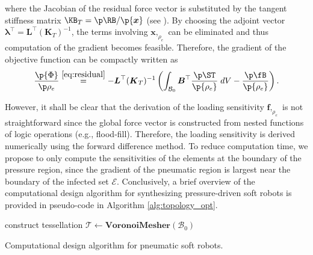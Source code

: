 \noindent where the Jacobian of the residual force vector is substituted by the tangent stiffness matrix $\KB_T = \p \RB/ \p {\boldsymbol{x}}$ (see \cite{Kim2018}). By choosing the adjoint vector $\boldsymbol{\lambda}^\top = \boldsymbol{L}^\top(\boldsymbol{K}_T)^{-1}$, the terms involving $\boldsymbol{x},_{\rho_e}$ can be eliminated and thus computation of the gradient becomes feasible. Therefore, the gradient of the objective function can be compactly written as
\begin{align}
\frac{\p {\Phi} }{\p \rho_e} \overset{\eqref{eq:residual}}{=} -\boldsymbol{L}^\top(\boldsymbol{K}_T)^{-1} \left( \int_{\mathcal{B}_0} \boldsymbol{B}^\top \frac{\p \ST}{\p {\rho_e}} \; dV - \frac{ \p \fB}{\p {\rho_e}}  \right). \label{eq:sens_f}
\end{align} 

\noindent However, it shall be clear that the derivation of the loading sensitivity $\boldsymbol{f}\!,_{\rho_e}$ is not straightforward since the global force vector is constructed from nested functions of logic operations (e.g., flood-fill). Therefore, the loading sensitivity is derived numerically using the forward difference method. To reduce computation time, we propose to only compute the sensitivities of the elements at the boundary of the pressure region, since the gradient of the pneumatic region is largest near the boundary of the infected set $\mathcal{E}$. Conclusively, a brief overview of the computational design algorithm for synthesizing pressure-driven soft robots is provided in pseudo-code in Algorithm \ref{alg:topology_opt}. 

\begin{algorithm}[!t]
  construct tessellation $\mathcal{T} \gets {\textbf{VoronoiMesher}}(\mathcal{B}_0)$\;
  \caption{Computational design algorithm for pneumatic soft robots.\label{alg:topology_opt}}
\end{algorithm}
